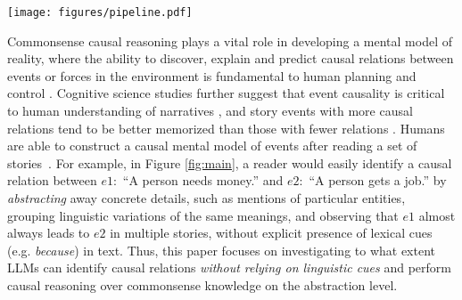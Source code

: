 \begin{figure*}[htb]
    \centering
    \texttt{[image: figures/pipeline.pdf]}
    \caption{Pipeline of abstract causal event discovery. An event is viewed from three hierarchical levels: \textbf{mention} (realization in a specific text corpus), \textbf{generalization} (conceptualization of the event's components) 
    and \textbf{abstraction} (group of causally consistent generalizations). Given a collection of event mentions, Phase $1$ produces a collection of abstractions $A, B,C$ that are mapped back to the original corpus to construct a suitable representation in Phase $2$, such as a co-occurrence matrix. Causal discovery algorithms can then be employed to detect causal relations within the data, which may consider the contexts.}
    \label{fig:main}
\end{figure*}


Commonsense causal reasoning plays a vital role in developing a mental model of reality, where the ability to discover, explain and predict causal relations between events or forces in the environment is fundamental to human planning and control \citep{johnson2017mental, griffiths2017formalizing}. Cognitive science studies further suggest that event causality is critical to human understanding of narratives \citep{van1996children,fletcher1988causal,tillman2020children,sun2023event}, and story events with more causal relations tend to be better memorized than those with fewer relations \citep{graesser200310}. Humans are able to construct a causal mental model of events after reading a set of stories~\citep{zwaan1995construction}. For example, in Figure \ref{fig:main}, a reader would easily identify a causal relation between $e1:$ ``A person needs money.'' and $e2:$ ``A person gets a job.'' by \textit{abstracting} away concrete details, such as mentions of particular entities, grouping linguistic variations of the same meanings, and observing that $e1$ almost always leads to $e2$ in multiple stories, without explicit presence of lexical cues (e.g. \textit{because}) in text. Thus, this paper focuses on investigating to what extent LLMs can identify causal relations \textit{without relying on linguistic cues} and perform causal reasoning over commonsense knowledge on the abstraction level.

